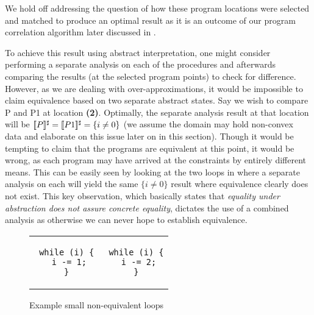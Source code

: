 We hold off addressing the question of how these program locations were selected and matched to produce an optimal result as it is an outcome of our program correlation algorithm later discussed in .

To achieve this result using abstract interpretation, one might consider performing a separate analysis on each of the procedures and afterwards comparing the results (at the selected program points) to check for difference. However, as we are dealing with over-approximations, it would be impossible to claim equivalence based on two separate abstract states. Say we wish to compare P and P1 at location \textbf{(2)}. Optimally, the separate analysis result at that location will be $\lbrack\!\lbrack P \rbrack\!\rbrack^{\sharp} = \lbrack\!\lbrack P1 \rbrack\!\rbrack^{\sharp} = \{i \neq 0\}$ (we assume the domain may hold non-convex data and elaborate on this issue later on in this section). Though it would be tempting to claim that the programs are equivalent at this point, it would be wrong, as each program may have arrived at the constraints by entirely different means. This can be easily seen by looking at the two loops in  where a separate analysis on each will yield the same $\{i \neq 0\}$ result where equivalence clearly does not exist. This key observation, which basically states that \emph{equality under abstraction does not assure concrete equality}, dictates the use of a combined analysis as otherwise we can never hope to establish equivalence.

\begin{figure}
\centering
\begin{tabular}{cc}
\begin{lstlisting}
 while (i) {
  i -= 1;
 }
\end{lstlisting}
&
\begin{lstlisting}
 while (i) {
  i -= 2;
 }
\end{lstlisting}
\end{tabular}
\caption{Example small non-equivalent loops}
\end{figure}

